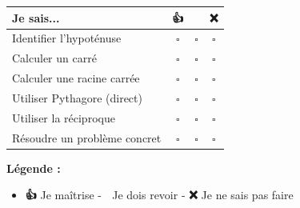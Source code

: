\begin{center}
	\begin{tabular}{|l|c|c|c|}
		\hline
		\textbf{Je sais...} & \textbf{👍} & \textbf{👀} & \textbf{❌} \\
		\hline
		Identifier l'hypoténuse & $\square$ & $\square$ & $\square$ \\
		\hline
		Calculer un carré & $\square$ & $\square$ & $\square$ \\
		\hline
		Calculer une racine carrée & $\square$ & $\square$ & $\square$ \\
		\hline
		Utiliser Pythagore (direct) & $\square$ & $\square$ & $\square$ \\
		\hline
		Utiliser la réciproque & $\square$ & $\square$ & $\square$ \\
		\hline
		Résoudre un problème concret & $\square$ & $\square$ & $\square$ \\
		\hline
	\end{tabular}
	
	\vspace{0.5cm}
	\textbf{Légende :} 
	\begin{itemize}
		\item \textbf{👍} Je maîtrise - \textbf{👀} Je dois revoir - \textbf{❌} Je ne sais pas faire
	\end{itemize}
\end{center}